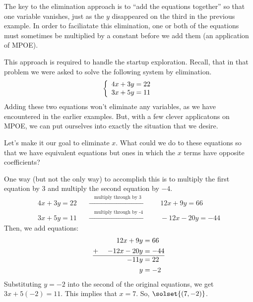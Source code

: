The key to the elimination approach is to ``add the equations together'' so that one variable vanishes, just as the $y$ disappeared on the third in the previous example. In order to faciliatate this elimination, one or both of the equations must sometimes be multiplied by a constant before we add them (an application of MPOE).

This approach is required to handle the startup exploration. Recall, that in that problem we were asked to solve the following system by elimination.\[\left\{\begin{array}{l}4x+3y=22\\3x+5y=11\end{array}\right.\]
Adding these two equations won't eliminate any variables, as we have encountered in the earlier examples. But, with a few clever applicatons on MPOE, we can put ourselves into exactly the situation that we desire.

Let's make it our goal to eliminate $x$. What could we do to these equations so that we have equivalent equations but ones in which the $x$ terms have opposite coefficients?

One way (but not the only way) to accomplish this is to multiply the first equation by 3 and multiply the second equation by $-4$.
\[\begin{array}{lcl}
4x+3y=22
& \quad \xrightarrow{\quad\text{multiply through by 3}\quad}
& \quad 12x + 9y = 66
\\
3x+5y=11
& \quad \xrightarrow{\quad\text{multiply through by -4}\quad}
& \quad -12x - 20y = -44
\end{array}\]
Then, we add equations:
\[
\begin{aligned}
		&&12x + 9y		&= 66\\
+~		&&-12x - 20y	&= -44\\\hline
		&&-11y	& = 22\\
		&&y	& = -2\\
\end{aligned}
\]
Substituting $y=-2$ into the second of the original equations, we get $3x + 5(-2) = 11$. This implies that $x=7$. So, $\solset{(7,-2)}$.


